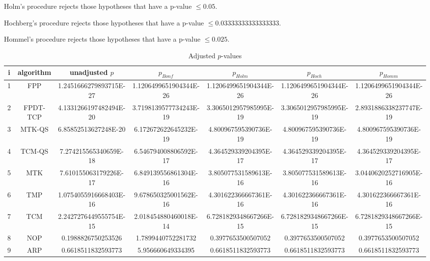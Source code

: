 \documentclass[a4paper,10pt]{article}
\begin{document}
\begin{landscape}
Holm's procedure rejects those hypotheses that have a p-value $\le0.05$.


Hochberg's procedure rejects those hypotheses that have a p-value $\le0.03333333333333333$.


Hommel's procedure rejects those hypotheses that have a p-value $\le0.025$.


\begin{table}[!htp]
\centering\tiny
\caption{Adjusted $p$-values}
\begin{tabular}{ccccccc}
i&algorithm&unadjusted $p$&$p_{Bonf}$&$p_{Holm}$&$p_{Hoch}$&$p_{Homm}$\\
\hline
1&FPP&1.2451666279893715E-27&1.1206499651904344E-26&1.1206499651904344E-26&1.1206499651904344E-26&1.1206499651904344E-26\\
2&FPDT-TCP&4.1331266197482494E-20&3.7198139577734243E-19&3.3065012957985995E-19&3.3065012957985995E-19&2.8931886338237747E-19\\
3&MTK-QS&6.85852513627248E-20&6.172672622645232E-19&4.800967595390736E-19&4.800967595390736E-19&4.800967595390736E-19\\
4&TCM-QS&7.274215565340659E-18&6.546794008806592E-17&4.364529339204395E-17&4.364529339204395E-17&4.364529339204395E-17\\
5&MTK&7.610155063179226E-17&6.849139556861304E-16&3.805077531589613E-16&3.805077531589613E-16&3.0440620252716905E-16\\
6&TMP&1.0754055916668403E-16&9.678650325001562E-16&4.301622366667361E-16&4.301622366667361E-16&4.301622366667361E-16\\
7&TCM&2.2427276449555754E-15&2.018454880460018E-14&6.7281829348667266E-15&6.7281829348667266E-15&6.7281829348667266E-15\\
8&NOP&0.1988826750253526&1.7899440752281732&0.3977653500507052&0.3977653500507052&0.3977653500507052\\
9&ARP&0.6618511832593773&5.956660649334395&0.6618511832593773&0.6618511832593773&0.6618511832593773\\
\hline
\end{tabular}
\end{table}


\end{landscape}
\end{document}
